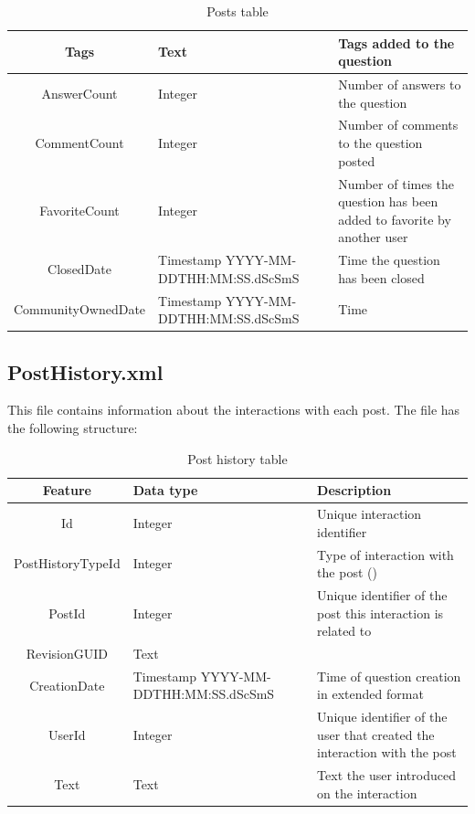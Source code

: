 \documentclass[11pt]{book} %
\begin{document}
\begin{table}[!ht]
\begin{tabular}{|c|p{}|p{}|}
          Tags & Text & Tags added to the question \\ \hline
          AnswerCount & Integer & Number of answers to the question \\ \hline
          CommentCount & Integer & Number of comments to the question posted \\ \hline
          FavoriteCount & Integer & Number of times the question has been added to favorite by another user \\ \hline
          ClosedDate & Timestamp YYYY-MM-DDTHH:MM:SS.dScSmS & Time the question has been closed \\ \hline
          CommunityOwnedDate & Timestamp YYYY-MM-DDTHH:MM:SS.dScSmS & Time \\ 

          \hline
        \end{tabular}
        \caption{Posts table}
        \label{tab:posts}
      \end{table}

\newpage

    \subsection{PostHistory.xml}

      This file contains information about the interactions with each post. The file has the following structure:

      \begin{table}[!ht]
        \centering
        \begin{tabular}{|c|p{}|p{}|}
          \hline

          Feature & Data type & Description \\ \hline
          Id & Integer & Unique interaction identifier \\ \hline
          PostHistoryTypeId & Integer & Type of interaction with the post () \\ \hline
          PostId & Integer & Unique identifier of the post this interaction is related to \\ \hline
          RevisionGUID & Text &  \\ \hline
          CreationDate & Timestamp YYYY-MM-DDTHH:MM:SS.dScSmS & Time of question creation in extended format \\ \hline
          UserId & Integer & Unique identifier of the user that created the interaction with the post \\ \hline
          Text & Text & Text the user introduced on the interaction \\ \hline

          \hline
        \end{tabular}
        \caption{Post history table}
        \label{tab:posthistory}
      \end{table}
\end{document}
